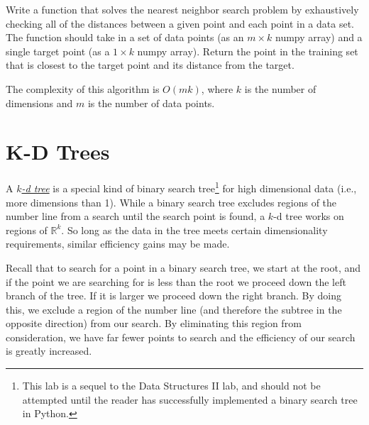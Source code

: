 \begin{problem}
Write a function that solves the nearest neighbor search problem by exhaustively checking all of the distances between a given point and each point in a data set.
The function should take in a set of data points (as an $m \times k$ numpy array) and a single target point (as a $1 \times k$ numpy array).
Return the point in the training set that is closest to the target point and its distance from the target.
\end{problem}

The complexity of this algorithm is $O(mk)$, where $k$ is the number of dimensions and $m$ is the number of data points.

\section*{K-D Trees}

A \href{https://en.wikipedia.org/wiki/K-d_tree}{\emph{$k$-d tree}} is a special kind of binary search tree\footnote{This lab is a sequel to the Data Structures II lab, and should not be attempted until the reader has successfully implemented a binary search tree in Python.} for high dimensional data (i.e., more dimensions than 1).
While a binary search tree excludes regions of the number line from a search until the search point is found, a $k$-d tree works on regions of $\mathbb{R}^k$.
So long as the data in the tree meets certain dimensionality requirements, similar efficiency gains may be made.

Recall that to search for a point in a binary search tree, we start at the root, and if the point we are searching for is less than the root we proceed down the left branch of the tree.
If it is larger we proceed down the right branch.
By doing this, we exclude a region of the number line (and therefore the subtree in the opposite direction) from our search.
By eliminating this region from consideration, we have far fewer points to search and the efficiency of our search is greatly increased.


